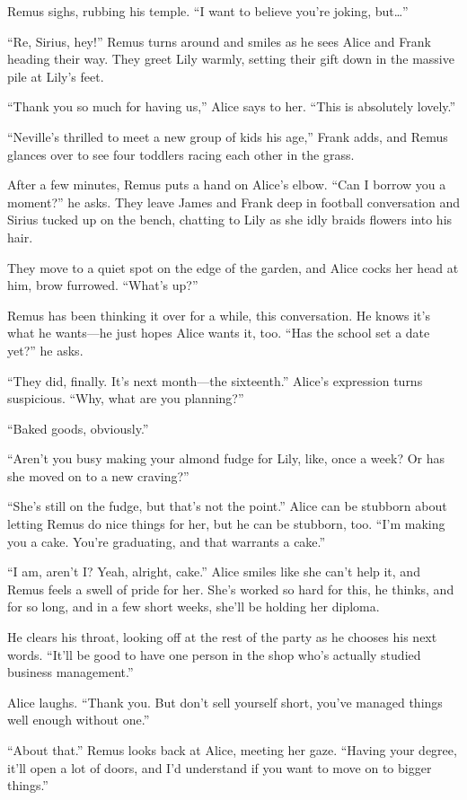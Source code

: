 Remus sighs, rubbing his temple. “I want to believe you’re joking, but…”

“Re, Sirius, hey!” Remus turns around and smiles as he sees Alice and Frank heading their way. They greet Lily warmly, setting their gift down in the massive pile at Lily’s feet.

“Thank you so much for having us,” Alice says to her. “This is absolutely lovely.”

“Neville’s thrilled to meet a new group of kids his age,” Frank adds, and Remus glances over to see four toddlers racing each other in the grass.

After a few minutes, Remus puts a hand on Alice’s elbow. “Can I borrow you a moment?” he asks. They leave James and Frank deep in football conversation and Sirius tucked up on the bench, chatting to Lily as she idly braids flowers into his hair.

They move to a quiet spot on the edge of the garden, and Alice cocks her head at him, brow furrowed. “What’s up?”

Remus has been thinking it over for a while, this conversation. He knows it’s what he wants—he just hopes Alice wants it, too. “Has the school set a date yet?” he asks.

“They did, finally. It’s next month—the sixteenth.” Alice’s expression turns suspicious. “Why, what are you planning?”

“Baked goods, obviously.”

“Aren’t you busy making your almond fudge for Lily, like, once a week? Or has she moved on to a new craving?”

“She’s still on the fudge, but that’s not the point.” Alice can be stubborn about letting Remus do nice things for her, but he can be stubborn, too. “I’m making you a cake. You’re graduating, and that warrants a cake.”

“I am, aren’t I? Yeah, alright, cake.” Alice smiles like she can’t help it, and Remus feels a swell of pride for her. She’s worked so hard for this, he thinks, and for so long, and in a few short weeks, she’ll be holding her diploma.

He clears his throat, looking off at the rest of the party as he chooses his next words. “It’ll be good to have one person in the shop who’s actually studied business management.”

Alice laughs. “Thank you. But don’t sell yourself short, you’ve managed things well enough without one.”

“About that.” Remus looks back at Alice, meeting her gaze. “Having your degree, it’ll open a lot of doors, and I’d understand if you want to move on to bigger things.”

